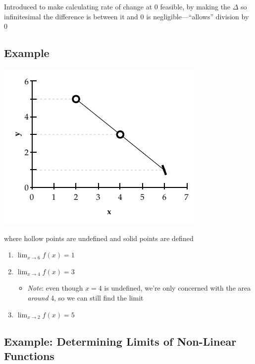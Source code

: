 Introduced to make calculating rate of change at 0 feasible, by making the $\Delta$ so infinitesimal the difference is between it and 0 is negligible---``allows'' division by 0

\subsection*{Example}

\begin{center}
    \includegraphics{linear_limits2}
\end{center}

where hollow points are undefined and solid points are defined

\begin{enumerate}
    \item $\lim_{x \rightarrow 6} f(x) = 1$
    \item $\lim_{x \rightarrow 4} f(x) = 3$
        \begin{itemize}
            \item \textit{Note}: even though $x=4$ is undefined, we're only concerned with the area \textit{around} 4, so we can still find the limit
        \end{itemize}
    \item $\lim_{x \rightarrow 2} f(x) = 5$
\end{enumerate}

\subsection*{Example: Determining Limits of Non-Linear Functions}

